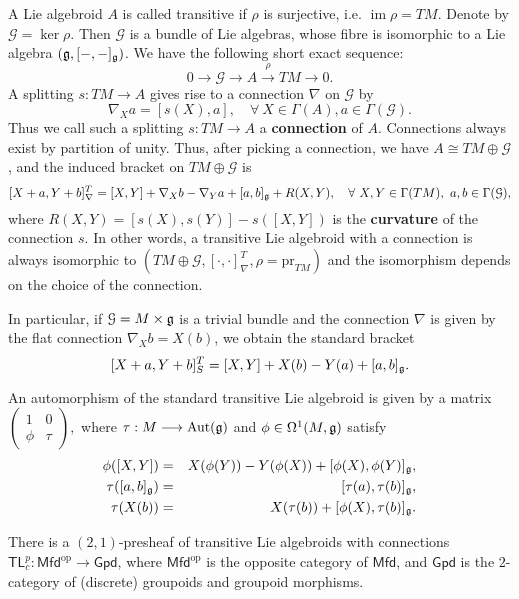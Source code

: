 \documentclass[letterpaper,10pt, oneside]{article} %
\newcommand{\Mfd}{\mathsf{Mfd}}%
\newcommand{\Gpd}{\mathsf{Gpd}}%
\newcommand{\tlp}{{\mathsf{TL}^{p}_{c}}} %
\DeclareMathOperator{\im}{im}
\newcommand{\op}{\mathrm{op}}%
\newcommand{\brtl}[1]{   [    #1   ]_{\nabla}^T   }
\newcommand{\brtls}[1]{   [    #1   ]_S^T   }
\newcommand{\huaG}{\mathcal{G}}
\newcommand{\Aut}{\mathrm{Aut}}
\newcommand{\pr}{\mathrm{pr}}
\begin{document}
A Lie algebroid $A$ is called transitive if $\rho$ is surjective, i.e. $\im\rho=TM$. Denote by $\huaG=\ker\rho$. Then $\huaG$ is a bundle of Lie algebras, whose fibre is isomorphic to a Lie algebra $(\mathfrak g,[-,-]_\mathfrak g)$. We have the following short exact sequence:
$$
0\longrightarrow\huaG\longrightarrow A\stackrel{\rho}{\longrightarrow}TM\longrightarrow 0.
$$
 A splitting $s:TM\longrightarrow A$   gives rise to a connection $\nabla$ on $\huaG$ by
 $$
 \nabla_Xa=[s(X),a], \quad \forall~X\in\Gamma(A), a\in\Gamma(\huaG).
 $$ Thus we call such a splitting $s: TM\longrightarrow A$ a {\bf connection} of $A$. Connections always exist by partition of unity. Thus, after picking a connection, we have
 $A \cong TM\oplus \huaG$, and the induced bracket on $TM\oplus \huaG$ is
\begin{equation}\label{br:tlc}
\brtl{X+a,Y+b}=[X,Y]+\nabla_Xb-\nabla_Ya+[a,b]_\g+R(X,Y), \quad \forall~X,Y\in\Gamma(TM),~a, b\in\Gamma(\huaG),
\end{equation}
where $R(X,Y)=[s(X),s(Y)]-s([X,Y])$ is the {\bf curvature} of the connection  $s$.  In other words, a transitive Lie algebroid with a connection is always isomorphic to $(TM\oplus \huaG,\brtl{\cdot,\cdot},\rho=\pr_{TM})$ and the isomorphism depends on the choice of the connection.

In particular, if $\huaG=M\times \g$ is a trivial bundle and the connection $\nabla$ is given by the flat connection $\nabla_Xb=X(b)$, we obtain the standard bracket
\begin{equation}\label{br:tls}
\brtls{X+a,Y+b}=[X,Y]+ X(b)-Y(a)+[a,b]_\g.
\end{equation}

An automorphism of the standard transitive Lie algebroid is given by a matrix
$
\left(\begin{array}{cc}
1&0\\
\phi&\tau
\end{array} \right),
$
where $\tau:M\longrightarrow\Aut(\g)$ and $\phi\in \Omega^1(M,\mathfrak g)$ satisfy
\begin{eqnarray*}
  \phi([X,Y])&=&X(\phi(Y))-Y(\phi(X))+[\phi(X),\phi(Y)]_\mathfrak g,\\
  \tau([a,b]_\mathfrak g)&=&[\tau(a),\tau(b)]_\mathfrak g,\\
  \tau(X(b))&=& X(\tau(b))+[\phi(X),\tau(b)]_\mathfrak g.
\end{eqnarray*}


There is a $(2,1)$-presheaf of transitive Lie algebroids with
connections $\tlp: \Mfd^{\op} \to \Gpd$, where $\Mfd^{\op}$ is the
opposite  category of
$\Mfd$, and $\Gpd$ is the
$2$-category of (discrete) groupoids and groupoid morphisms.
\end{document}
